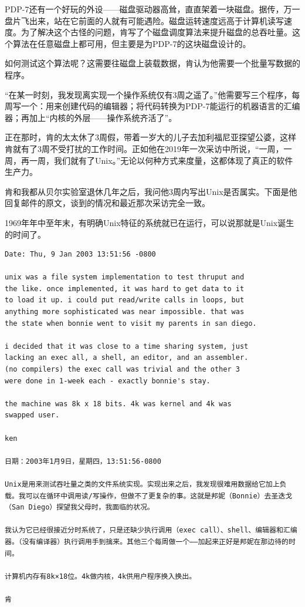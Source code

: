 \documentclass[a4paper,12pt,UTF8,twoside]{ctexbook}
\begin{document}
PDP-7还有一个好玩的外设——磁盘驱动器高耸，直直架着一块磁盘。据传，万一盘片飞出来，站在它前面的人就有可能遇险。磁盘运转速度远高于计算机读写速度。为了解决这个古怪的问题，肯写了个磁盘调度算法来提升磁盘的总吞吐量。这个算法在任意磁盘上都可用，但主要是为PDP-7的这块磁盘设计的。

如何测试这个算法呢？这需要往磁盘上装载数据，肯认为他需要一个批量写数据的程序。

“在某一时刻，我发现离实现一个操作系统仅有3周之遥了。”他需要写三个程序，每周写一个：用来创建代码的编辑器；将代码转换为PDP-7能运行的机器语言的汇编器；再加上“内核的外层——操作系统齐活了”。

正在那时，肯的太太休了3周假，带着一岁大的儿子去加利福尼亚探望公婆，这样肯就有了3周不受打扰的工作时间。正如他在2019年一次采访中所说，“一周，一周，再一周，我们就有了Unix。”无论以何种方式来度量，这都体现了真正的软件生产力。

肯和我都从贝尔实验室退休几年之后，我问他3周内写出Unix是否属实。下面是他回复邮件的原文，谈到的情况和最近那次采访完全一致。

1969年年中至年末，有明确Unix特征的系统就已在运行，可以说那就是Unix诞生的时间了。

\begin{lstlisting}
Date: Thu, 9 Jan 2003 13:51:56 -0800

unix was a file system implementation to test thruput and
the like. once implemented, it was hard to get data to it
to load it up. i could put read/write calls in loops, but
anything more sophisticated was near impossible. that was
the state when bonnie went to visit my parents in san diego.

i decided that it was close to a time sharing system, just
lacking an exec all, a shell, an editor, and an assembler.
(no compilers) the exec call was trivial and the other 3
were done in 1-week each - exactly bonnie's stay.

the machine was 8k x 18 bits. 4k was kernel and 4k was
swapped user.

ken

日期：2003年1月9日，星期四，13:51:56-0800

Unix是用来测试吞吐量之类的文件系统实现。实现出来之后，我发现很难用数据给它加上负载。我可以在循环中调用读/写操作，但做不了更复杂的事。这就是邦妮（Bonnie）去圣迭戈（San Diego）探望我父母时，我面临的状况。

我认为它已经很接近分时系统了，只是还缺少执行调用（exec call）、shell、编辑器和汇编器。（没有编译器）执行调用手到擒来。其他三个每周做一个——加起来正好是邦妮在那边待的时间。

计算机内存有8k×18位。4k做内核，4k供用户程序换入换出。

肯
\end{lstlisting}
\end{document}
